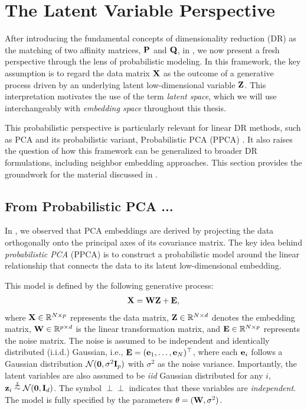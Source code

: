 \section{The Latent Variable Perspective}\label{sec:dr_proba_modelling}

After introducing the fundamental concepts of dimensionality reduction (DR) as the matching of two affinity matrices, ${\mathbf{P}}$ and ${\mathbf{Q}}$, in , we now present a fresh perspective through the lens of probabilistic modeling. In this framework, the key assumption is to regard the data matrix ${\mathbf{X}}$ as the outcome of a generative process driven by an underlying latent low-dimensional variable ${\mathbf{Z}}$. This interpretation motivates the use of the term \emph{latent space}, which we will use interchangeably with \emph{embedding space} throughout this thesis.

This probabilistic perspective is particularly relevant for linear DR methods, such as PCA and its probabilistic variant, Probabilistic PCA (PPCA) \citep{tipping1999probabilistic}. It also raises the question of how this framework can be generalized to broader DR formulations, including neighbor embedding approaches. This section provides the groundwork for the material discussed in .

\subsection{From Probabilistic PCA ...}\label{sec:ppca}

In , we observed that PCA embeddings are derived by projecting the data orthogonally onto the principal axes of its covariance matrix. The key idea behind \emph{probabilistic PCA} (PPCA) is to construct a probabilistic model around the linear relationship that connects the data to its latent low-dimensional embedding.

This model is defined by the following generative process:
\begin{align}\label{eq:ppca_linear}
    {\mathbf{X}} = {\mathbf{W}} {\mathbf{Z}} + {\mathbf{E}},
\end{align}
where ${\mathbf{X}} \in \mathbb{R}^{N \times p}$ represents the data matrix, ${\mathbf{Z}} \in \mathbb{R}^{N \times d}$ denotes the embedding matrix, ${\mathbf{W}} \in \mathbb{R}^{p \times d}$ is the linear transformation matrix, and ${\mathbf{E}} \in \mathbb{R}^{N \times p}$ represents the noise matrix. The noise is assumed to be independent and identically distributed (i.i.d.) Gaussian, i.e., ${\mathbf{E}} = ({\mathbf{e}}_1, \ldots, {\mathbf{e}}_N)^\top$, where each ${\mathbf{e}}_i$ follows a Gaussian distribution $\mathcal{N}(\bm{0}, \sigma^2 {\mathbf{I}}_p)$ with $\sigma^2$ as the noise variance. Importantly, the latent variables are also assumed to be \emph{iid} Gaussian distributed \ie for any $i$, ${\mathbf{z}}_i \stackrel{\perp\!\!\!\!\perp}{\sim} \mathcal{N}(\bm{0}, {\mathbf{I}}_d)$. The symbol $\perp\!\!\!\!\perp$ indicates that these variables are \emph{independent}. The model is fully specified by the parameters $\theta = ({\mathbf{W}}, \sigma^2)$.

